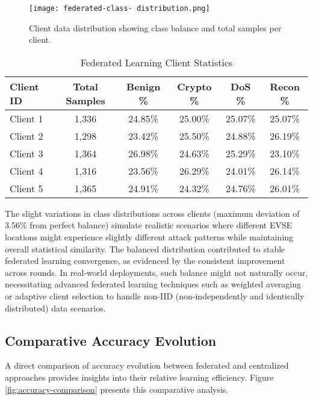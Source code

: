 \begin{figure}[H]
	\centering
	\texttt{[image: federated-class- distribution.png]}
	\caption{Client data distribution showing class balance and total samples per client.}
	\label{figure:federated-class- distribution.png}
\end{figure}

\begin{table}[H]
	\centering
	\renewcommand{\arraystretch}{1.15}
	\setlength{\tabcolsep}{8pt}
	\caption{Federated Learning Client Statistics}
	\label{tab:client-statistics}
	\begin{tabular}{@{}lccccc@{}}
		\toprule
		\textbf{Client ID} & \textbf{Total Samples} & \textbf{Benign \%} & \textbf{Crypto \%} & \textbf{DoS \%} & \textbf{Recon \%} \\
		\midrule
		Client 1 & 1,336 & 24.85\% & 25.00\% & 25.07\% & 25.07\% \\
		Client 2 & 1,298 & 23.42\% & 25.50\% & 24.88\% & 26.19\% \\
		Client 3 & 1,364 & 26.98\% & 24.63\% & 25.29\% & 23.10\% \\
		Client 4 & 1,316 & 23.56\% & 26.29\% & 24.01\% & 26.14\% \\
		Client 5 & 1,365 & 24.91\% & 24.32\% & 24.76\% & 26.01\% \\
		\bottomrule
	\end{tabular}
\end{table}

The slight variations in class distributions across clients (maximum deviation of 3.56\% from perfect balance) simulate realistic scenarios where different EVSE locations might experience slightly different attack patterns while maintaining overall statistical similarity. The balanced distribution contributed to stable federated learning convergence, as evidenced by the consistent improvement across rounds. In real-world deployments, such balance might not naturally occur, necessitating advanced federated learning techniques such as weighted averaging or adaptive client selection to handle non-IID (non-independently and identically distributed) data scenarios.

\subsection{Comparative Accuracy Evolution}

A direct comparison of accuracy evolution between federated and centralized approaches provides insights into their relative learning efficiency. Figure \ref{fig:accuracy-comparison} presents this comparative analysis.

